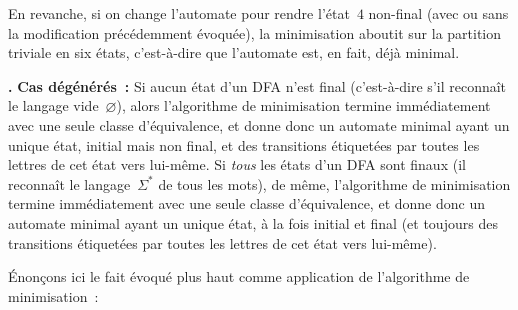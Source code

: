 \documentclass[12pt,a4paper]{article}
\theoremstyle{definition}
\newcommand\thingy{%
\refstepcounter{comcnt}\medskip\noindent\textbf{\thecomcnt.} }
\begin{document}
En revanche, si on change l'automate pour rendre l'état $4$ non-final
(avec ou sans la modification précédemment évoquée), la minimisation
aboutit sur la partition triviale en six états, c'est-à-dire que
l'automate est, en fait, déjà minimal.

{\footnotesize\thingy\textbf{Cas dégénérés :} Si aucun état d'un DFA
  n'est final (c'est-à-dire s'il reconnaît le langage
  vide $\varnothing$), alors l'algorithme de minimisation termine
  immédiatement avec une seule classe d'équivalence, et donne donc un
  automate minimal ayant un unique état, initial mais non final, et
  des transitions étiquetées par toutes les lettres de cet état vers
  lui-même.  Si \emph{tous} les états d'un DFA sont finaux (il
  reconnaît le langage $\Sigma^*$ de tous les mots), de même,
  l'algorithme de minimisation termine immédiatement avec une seule
  classe d'équivalence, et donne donc un automate minimal ayant un
  unique état, à la fois initial et final (et toujours des transitions
  étiquetées par toutes les lettres de cet état vers lui-même).\par}

\bigbreak

Énonçons ici le fait évoqué plus haut comme application de
l'algorithme de minimisation :
\end{document}
